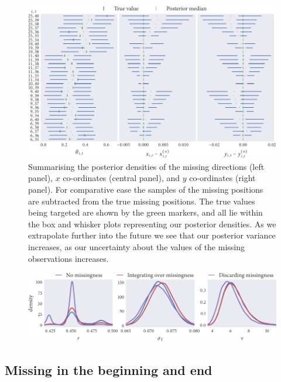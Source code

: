 \begin{figure}[tbp]
  \includegraphics{end/summary.pdf}
  \caption{Summarising the posterior densities of the missing directions (left
  panel), $x$ co-ordinates (central panel), and $y$ co-ordinates (right
  panel). For comparative ease the samples of the missing positions are
  subtracted from the true missing positions. The true values being
  targeted are shown by the green markers, and all lie within the box and
  whisker plots representing our posterior densities. As we extrapolate further
  into the future we see that our posterior variance increases, as our
  uncertainty about the values of the missing observations increases.}
  \label{fig:end_summary}
\end{figure}

\begin{figure}
  \includegraphics{end/compare_params.pdf}
  \caption{}
  \label{fig:end_compare}
\end{figure}

\subsection{Missing in the beginning and end}

